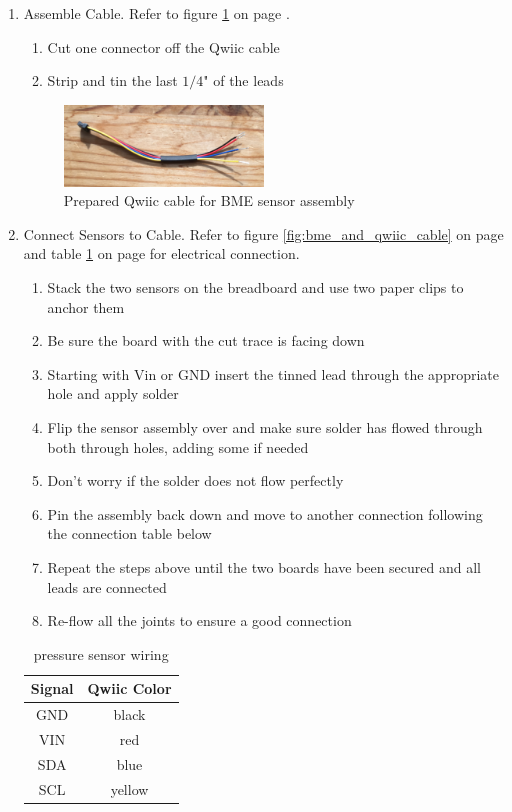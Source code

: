 \documentclass[11pt, letterpaper]{article}
\begin{document}
\begin{enumerate}
\begin{enumerate}[label=3.\arabic*]
\item
Assemble Cable. Refer to figure \ref{fig:bme_qwiic_cable} on page \pageref{fig:bme_qwiic_cable}.
\begin{enumerate}[label=3.3.\arabic*]
\item
Cut one connector off the Qwiic cable
\item
Strip and tin the last $1/4$" of the leads
\end{enumerate}
\begin{figure}[H]
\centering
\includegraphics[width=0.5\textwidth]{bme_qwiic_cable.JPG}
\caption{Prepared Qwiic cable for BME sensor assembly}
\label{fig:bme_qwiic_cable}
\end{figure}
\item
Connect Sensors to Cable. Refer to figure \ref{fig:bme_and_qwiic_cable} on page \pageref{fig:bme_and_qwiic_cable} and table \ref{tab:pressure} on page \pageref{tab:pressure} for electrical connection.
\begin{enumerate}[label=3.4.\arabic*]
\item
Stack the two sensors on the breadboard and use two paper clips to anchor them
\item
Be sure the board with the cut trace is facing down
\item
Starting with Vin or GND insert the tinned lead through the appropriate hole and apply solder
\item
Flip the sensor assembly over and make sure solder has flowed through both through holes, adding some if needed
\item
Don't worry if the solder does not flow perfectly
\item
Pin the assembly back down and move to another connection following the connection table below
\item
Repeat the steps above until the two boards have been secured and all leads are connected
\item
Re-flow all the joints to ensure a good connection
\end{enumerate}

\begin{table}[H]
\centering
\begin{tabular}{| c | c |}
\hline
Signal & Qwiic Color\\  \hline
GND & black  \\  \hline
VIN & red \\  \hline
SDA & blue \\  \hline
SCL & yellow \\
\hline
\end{tabular}
\caption{pressure sensor wiring}
\label{tab:pressure}
\end{table}


\end{enumerate}
\end{enumerate}
\end{document}
